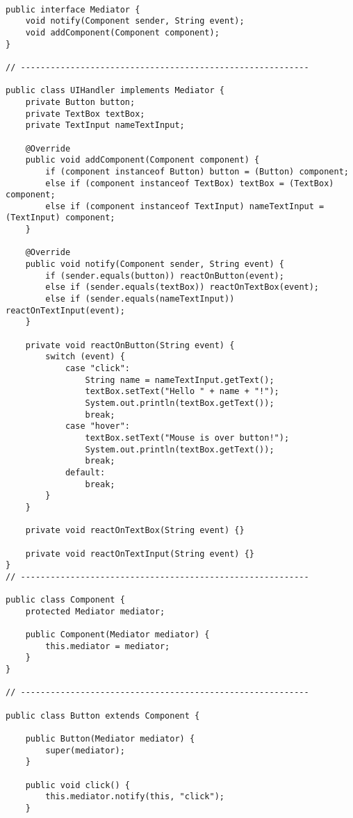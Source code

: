 \begin{verbatim}

public interface Mediator {
    void notify(Component sender, String event);
    void addComponent(Component component);
}

// ----------------------------------------------------------

public class UIHandler implements Mediator {
    private Button button;
    private TextBox textBox;
    private TextInput nameTextInput;

    @Override
    public void addComponent(Component component) {
        if (component instanceof Button) button = (Button) component;
        else if (component instanceof TextBox) textBox = (TextBox) component;
        else if (component instanceof TextInput) nameTextInput = (TextInput) component;
    }

    @Override
    public void notify(Component sender, String event) {
        if (sender.equals(button)) reactOnButton(event);
        else if (sender.equals(textBox)) reactOnTextBox(event);
        else if (sender.equals(nameTextInput)) reactOnTextInput(event);
    }

    private void reactOnButton(String event) {
        switch (event) {
            case "click":
                String name = nameTextInput.getText();
                textBox.setText("Hello " + name + "!");
                System.out.println(textBox.getText());
                break;
            case "hover":
                textBox.setText("Mouse is over button!");
                System.out.println(textBox.getText());
                break;
            default:
                break;
        }
    }

    private void reactOnTextBox(String event) {}

    private void reactOnTextInput(String event) {}
}
// ----------------------------------------------------------

public class Component {
    protected Mediator mediator;

    public Component(Mediator mediator) {
        this.mediator = mediator;
    }
}

// ----------------------------------------------------------

public class Button extends Component {

    public Button(Mediator mediator) {
        super(mediator);
    }

    public void click() {
        this.mediator.notify(this, "click");
    }


\end{verbatim}
